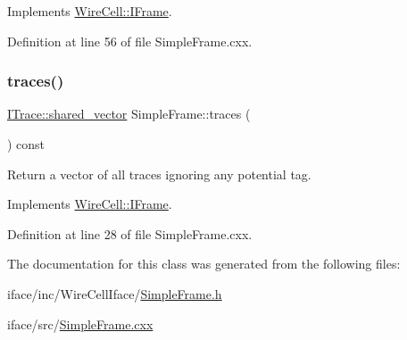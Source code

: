 Implements \hyperlink{class_wire_cell_1_1_i_frame_aac1f359b2e383089e718853d359f8a97}{Wire\+Cell\+::\+I\+Frame}.



Definition at line 56 of file Simple\+Frame.\+cxx.

\mbox{\label{class_wire_cell_1_1_simple_frame_aec2f4f732121b801887077c874cb8b98}} 
\subsubsection{\texorpdfstring{traces()}{traces()}}
{\footnotesize\ttfamily \hyperlink{class_wire_cell_1_1_i_data_a6edac35e7dd886018740993b28c7ca1e}{I\+Trace\+::shared\+\_\+vector} Simple\+Frame\+::traces (\begin{DoxyParamCaption}{ }\end{DoxyParamCaption}) const\hspace{0.3cm}{\ttfamily [virtual]}}



Return a vector of all traces ignoring any potential tag. 



Implements \hyperlink{class_wire_cell_1_1_i_frame_aff349734fe22aafed42c3dc0b7553f64}{Wire\+Cell\+::\+I\+Frame}.



Definition at line 28 of file Simple\+Frame.\+cxx.



The documentation for this class was generated from the following files\+:\begin{DoxyCompactItemize}
\item 
iface/inc/\+Wire\+Cell\+Iface/\hyperlink{_simple_frame_8h}{Simple\+Frame.\+h}\item 
iface/src/\hyperlink{_simple_frame_8cxx}{Simple\+Frame.\+cxx}\end{DoxyCompactItemize}
